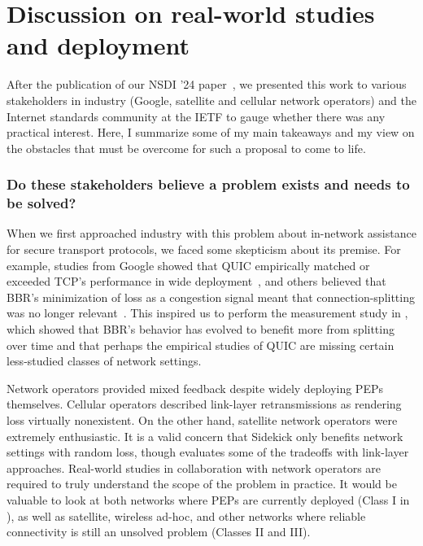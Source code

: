 \section{Discussion on real-world studies and deployment}
\label{sec:conclusion:real-world}

After the publication of our NSDI '24 paper~\cite{yuan2024sidekick}, we
presented this work to various stakeholders in industry (Google, satellite and
cellular network operators) and the Internet standards community at the IETF to
gauge whether there was any practical interest. Here, I summarize some of my
main takeaways and my view on the obstacles that must be overcome for such a
proposal to come to life.

\subsubsection{Do these stakeholders believe a problem exists and needs to be
 solved?}

When we first approached industry with this problem about in-network assistance
for secure transport protocols, we faced some skepticism about its premise.
For example, studies from Google showed that QUIC empirically matched or
exceeded TCP's performance in wide deployment~\cite{langley2017quic}, and others
believed that BBR's minimization of loss as a congestion signal meant that
connection-splitting was no longer relevant~\cite{frode}. This inspired us to
perform the measurement study in
, which showed that BBR's behavior has evolved to benefit
more from splitting over time and that perhaps the empirical studies of QUIC
are missing certain less-studied classes of network settings.

Network operators provided mixed feedback despite widely deploying PEPs
themselves. Cellular operators described link-layer retransmissions as
rendering loss virtually nonexistent. On the other hand, satellite network
operators were extremely enthusiastic. It is a valid concern that Sidekick
only benefits network settings with random loss, though 
evaluates some of the tradeoffs with link-layer approaches. Real-world studies
in collaboration with network operators are required to truly understand the
scope of the problem in practice. It would be valuable to look at both networks
where PEPs are currently deployed (Class I in ), as well as
satellite, wireless ad-hoc, and other networks where reliable connectivity is
still an unsolved problem (Classes II and III).

